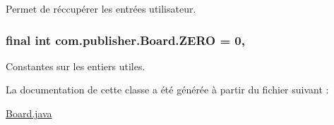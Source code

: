 Permet de réccupérer les entrées utilisateur. \hypertarget{classcom_1_1publisher_1_1Board_a2932f7bf815d54abfa0558e1dd7fa8fe}{
\subsubsection[{Z\-E\-R\-O}]{\setlength{\rightskip}{0pt plus 5cm}final int com.\-publisher.\-Board.\-Z\-E\-R\-O = 0\hspace{0.3cm}{\ttfamily [static]}, {\ttfamily [private]}}}\label{classcom_1_1publisher_1_1Board_a2932f7bf815d54abfa0558e1dd7fa8fe}
Constantes sur les entiers utiles. 

La documentation de cette classe a été générée à partir du fichier suivant \-:\begin{DoxyCompactItemize}
\item 
\hyperlink{Board_8java}{Board.\-java}\end{DoxyCompactItemize}
